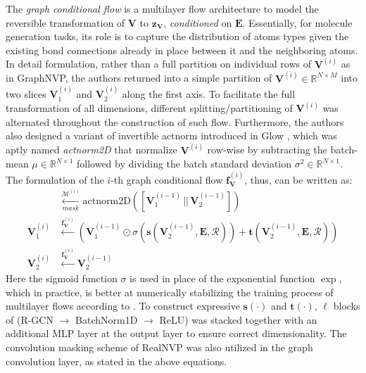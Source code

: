 The \textit{graph conditional flow} is a multilayer flow architecture to model
the reversible transformation of $\mathbf{V}$ to $\mathbf{z}_{\mathbf{V}}$,
\textit{conditioned} on $\mathbf{E}$. Essentially, for molecule generation tasks,
its role is to capture the distribution of atoms types given the existing bond
connections already in place between it and the neighboring atoms. In detail
formulation, rather than a full partition on individual rows of
$\mathbf{V}^{(i)}$ as in GraphNVP, the authors returned
into a simple partition of $\mathbf{V}^{(i)} \in \mathbb{R}^{N \times M}$ into
two slices $\mathbf{V}^{(i)}_1$ and $\mathbf{V}^{(i)}_2$ along the first axis.
To facilitate the full transformation of all dimensions, different
splitting/partitioning of $\mathbf{V}^{(i)}$ was alternated throughout the
construction of such flow. Furthermore, the authors also designed a variant of
invertible actnorm introduced in Glow \citep{kingmaGlowGenerativeFlow2018}, which
was aptly named \textit{actnorm2D} that normalize
$\mathbf{V}^{(i)}$ row-wise by subtracting the batch-mean $\mu \in \mathbb{R}^{N \times
1}$ followed by dividing the batch standard deviation $\sigma^2 \in
\mathbb{R}^{N \times 1}$. The formulation of the $i$-th graph conditional flow
$\mathbf{f}_{\mathbf{V}}^{(i)}$, thus, can be written as:
\begin{align*}
  [\mathbf{V}^{(i-1)}_1, \mathbf{V}^{(i-1)}_2]
  &\underset{mask}{\overset{\mathcal{M}^{(i)}}{\longleftarrow}}
  \text{actnorm2D}([\mathbf{V}^{(i-1)}_1 \,||\, \mathbf{V}^{(i-1)}_2])\\
  \mathbf{V}^{(i)}_1 &\overset{\mathbf{f}_{\mathbf{V}}^{(i)}}{\longleftarrow}
  (\mathbf{V}^{(i-1)}_1 \odot \sigma \left( \mathbf{s}(\mathbf{V}_2^{(i-1)},
  \mathbf{E}, \mathcal{R})\right) + \mathbf{t}(\mathbf{V}_2^{(i-1)}, \mathbf{E},
  \mathcal{R})) \\ \mathbf{V}^{(i)}_2
&\overset{\mathbf{f}_{\mathbf{V}}^{(i)}}{\longleftarrow} \mathbf{V}^{(i-1)}_2
\end{align*}
Here the sigmoid function $\sigma$ is used in place of the
exponential function $\exp$, which in practice, is better at numerically
stabilizing the training process of multilayer flows according to
\citep{zangMoFlowInvertibleFlow2020}. To construct expressive $\mathbf{s}(\cdot)$
and $\mathbf{t}(\cdot)$, $\ell$ blocks of (R-GCN $\rightarrow$ BatchNorm1D
$\rightarrow$ ReLU) was stacked together with an additional MLP layer at the
output layer to ensure correct dimensionality. The convolution masking scheme of
RealNVP \citep{dinhDensityEstimationUsing2017} was also utilized in the graph
convolution layer, as stated in the above equations.

